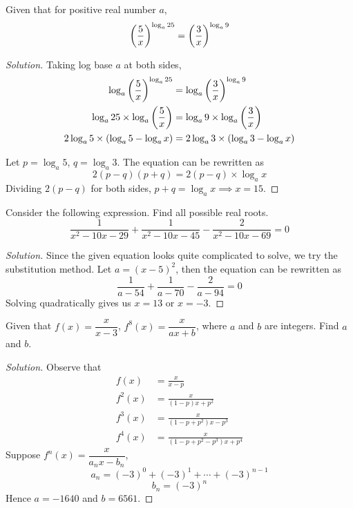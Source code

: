 \begin{prbm}
Given that for positive real number $a$,
\[ \left(\frac{5}{x}\right)^{\log_a 25} = \left(\frac{3}{x}\right)^{\log_a 9} \]
\end{prbm}

\begin{proof}[Solution]
Taking log base $a$ at both sides,
\begin{align*}
\log_a\left(\frac{5}{x}\right)^{\log_a 25} &= \log_a\left(\frac{3}{x}\right)^{\log_a 9} \\
\log_a 25 \times \log_a\left(\frac{5}{x}\right) &= \log_a 9 \times \log_a\left(\frac{3}{x}\right) \\
2\log_a 5 \times (\log_a 5-\log_a x) &= 2\log_a 3 \times (\log_a 3 - \log_a x)
\end{align*}

Let $p=\log_a 5$, $q=\log_a 3$. The equation can be rewritten as 
\[ 2(p-q)(p+q) = 2(p-q) \times \log_a x \]
Dividing $2(p-q)$ for both sides, $p+q=\log_ax\implies \boxed{x=15}$.
\end{proof}
\pagebreak

\begin{prbm}
Consider the following expression. Find all possible real roots.
\[ \frac{1}{x^2-10x-29} + \frac{1}{x^2-10x-45} - \frac{2}{x^2-10x-69} = 0 \]
\end{prbm}

\begin{proof}[Solution]
Since the given equation looks quite complicated to solve, we try the substitution method. Let $a=(x-5)^2$, then the equation can be rewritten as
\[ \frac{1}{a-54} + \frac{1}{a-70} - \frac{2}{a-94} = 0 \]
Solving quadratically gives us $\boxed{x=13}$ or $\boxed{x=-3}$.
\end{proof}
\pagebreak

\begin{prbm}[DOKA]
Given that $f(x)=\dfrac{x}{x-3}$,  $f^8(x)=\dfrac{x}{ax+b}$, where $a$ and $b$ are integers. Find $a$ and $b$.
\end{prbm}

\begin{proof}[Solution]
Observe that 
\begin{align*}
f(x) &= \frac{x}{x-p} \\
f^2(x) &= \frac{x}{(1-p)x+p^2} \\
f^3(x) &= \frac{x}{(1-p+p^2)x-p^3} \\
f^4(x) &= \frac{x}{(1-p+p^2-p^3)x+p^4}
\end{align*}
Suppose $f^n(x)=\dfrac{x}{a_nx-b_n}$, 
\[ a_n=(-3)^0+(-3)^1+\cdots+(-3)^{n-1} \]
\[ b_n=(-3)^n \]
Hence $\boxed{a=-1640}$ and $\boxed{b=6561}$.
\end{proof}
\pagebreak

